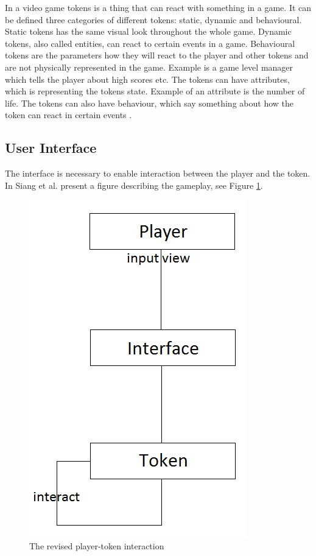 In a video game tokens is a thing that can react with something in a game. It can be defined three categories of different tokens: static, dynamic and behavioural. Static tokens has the same visual look throughout the whole game. Dynamic tokens, also called entities, can react to certain events in a game. Behavioural tokens are the parameters how they will react to the player and other tokens and are not physically represented in the game. Example is a game level manager which tells the player about high scores etc. The tokens can have attributes, which is representing the tokens state. Example of an attribute is the number of life. The tokens can also have behaviour, which say something about how the token can react in certain events \cite{umlapproach}.

\subsection{User Interface}
The interface is necessary to enable interaction between the player and the token. In \cite{umlapproach} Siang et al. present a figure describing the gameplay, see Figure \ref{fig:playerinterface}.

\begin{figure}
\begin{center}
\includegraphics[scale=0.5]{playerinterface}
\caption[The revised player-token interaction]{The revised player-token interaction \cite{umlapproach}}
\label{fig:playerinterface}
\end{center}
\end{figure} 

